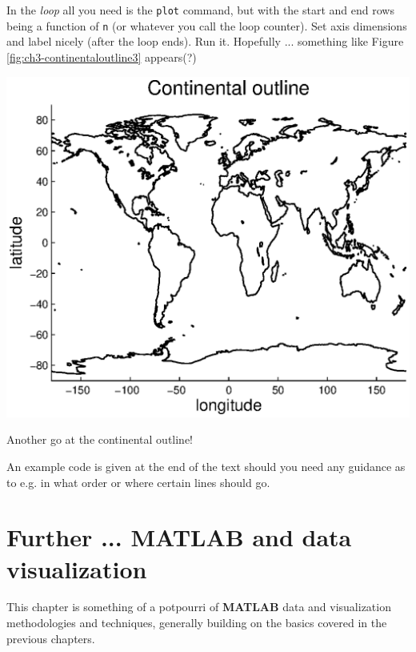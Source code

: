 \documentclass{tufte-book} %
\begin{document}
In the \textit{loop} all you need is the \texttt{plot} command, but with the start and end rows being a function of \texttt{n} (or whatever you call the loop counter). Set axis dimensions and label nicely (after the loop ends). Run it. Hopefully ... something like Figure \ref{fig:ch3-continentaloutline3} appears(?)

\begin{marginfigure}[0.0in]
\includegraphics[width=\linewidth]{ch3-continentaloutline3.eps}
\caption{Another go at the continental outline!}
\label{fig:ch3-continentaloutline3}
\end{marginfigure}

An example code is given at the end of the text should you need any guidance as to e.g. in what order or where certain lines should go.


\chapter{Further ... MATLAB and data visualization}
\label{ch:03}

%
This chapter is something of a potpourri of \textbf{MATLAB} data and visualization methodologies and techniques, generally building on the basics covered in the previous chapters.
\end{document}
